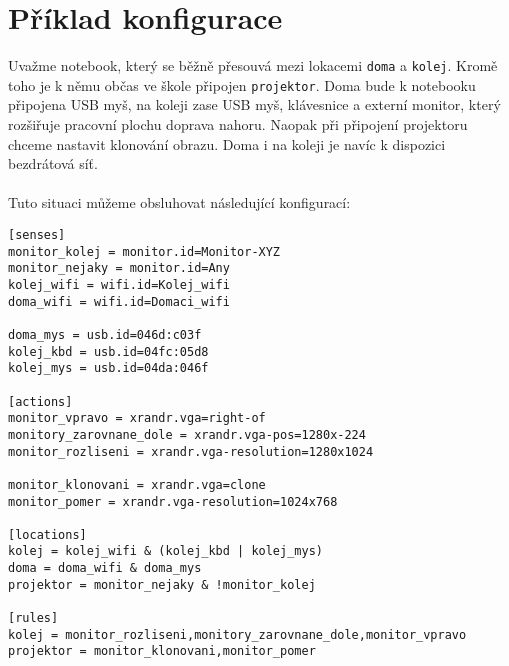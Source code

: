 \documentclass[10pt,a4paper]{article}
\begin{document}
\section*{Příklad konfigurace}
Uvažme notebook, který se běžně přesouvá mezi lokacemi \texttt{doma} a \texttt{kolej}. Kromě toho je k němu občas ve škole připojen \texttt{projektor}. Doma bude k notebooku připojena USB myš, na koleji zase USB myš, klávesnice a externí monitor, který rozšiřuje pracovní plochu doprava nahoru. Naopak při připojení projektoru chceme nastavit klonování obrazu. Doma i na koleji je navíc k dispozici bezdrátová síť. \\
\\
Tuto situaci můžeme obsluhovat následující konfigurací:
\begin{verbatim}
[senses]  
monitor_kolej = monitor.id=Monitor-XYZ
monitor_nejaky = monitor.id=Any
kolej_wifi = wifi.id=Kolej_wifi
doma_wifi = wifi.id=Domaci_wifi

doma_mys = usb.id=046d:c03f
kolej_kbd = usb.id=04fc:05d8
kolej_mys = usb.id=04da:046f

[actions]
monitor_vpravo = xrandr.vga=right-of
monitory_zarovnane_dole = xrandr.vga-pos=1280x-224
monitor_rozliseni = xrandr.vga-resolution=1280x1024 

monitor_klonovani = xrandr.vga=clone
monitor_pomer = xrandr.vga-resolution=1024x768 

[locations]
kolej = kolej_wifi & (kolej_kbd | kolej_mys)
doma = doma_wifi & doma_mys
projektor = monitor_nejaky & !monitor_kolej

[rules]
kolej = monitor_rozliseni,monitory_zarovnane_dole,monitor_vpravo
projektor = monitor_klonovani,monitor_pomer

\end{verbatim}
\end{document}
